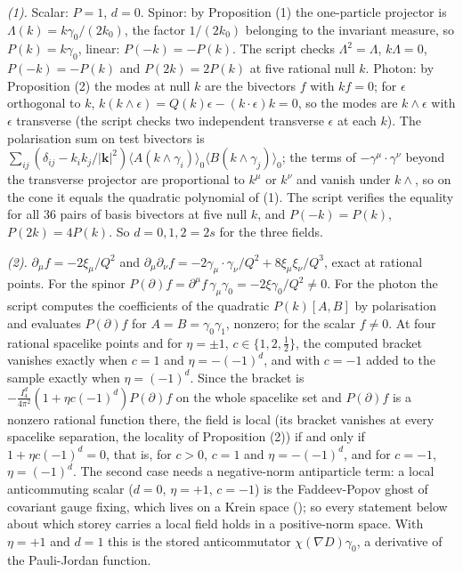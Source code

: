 \emph{(1).} Scalar: $P = 1$, $d = 0$. Spinor: by Proposition (1) the one-particle projector is $\Lambda(k) = k\gamma_{0}/(2k_{0})$, the factor $1/(2k_{0})$ belonging to the invariant measure, so $P(k) = k\gamma_{0}$, linear: $P(-k) = -P(k)$. The script checks $\Lambda^{2} = \Lambda$, $k\Lambda = 0$, $P(-k) = -P(k)$ and $P(2k) = 2P(k)$ at five rational null $k$. Photon: by Proposition (2) the modes at null $k$ are the bivectors $f$ with $kf = 0$; for $\epsilon$ orthogonal to $k$, $k(k \wedge \epsilon) = Q(k)\epsilon - (k\cdot\epsilon)k = 0$, so the modes are $k \wedge \epsilon$ with $\epsilon$ transverse (the script checks two independent transverse $\epsilon$ at each $k$). The polarisation sum on test bivectors is $\sum_{ij}(\delta_{ij} - k_{i}k_{j}/|\mathbf{k}|^{2})\langle A(k \wedge \gamma_{i})\rangle_{0}\langle B(k \wedge \gamma_{j})\rangle_{0}$; the terms of $-\gamma^{\mu}\cdot\gamma^{\nu}$ beyond the transverse projector are proportional to $k^{\mu}$ or $k^{\nu}$ and vanish under $k \wedge$, so on the cone it equals the quadratic polynomial of (1). The script verifies the equality for all $36$ pairs of basis bivectors at five null $k$, and $P(-k) = P(k)$, $P(2k) = 4P(k)$. So $d = 0, 1, 2 = 2s$ for the three fields.

\emph{(2).} $\partial_{\mu}f = -2\xi_{\mu}/Q^{2}$ and $\partial_{\mu}\partial_{\nu}f = -2\gamma_{\mu}\cdot\gamma_{\nu}/Q^{2} + 8\xi_{\mu}\xi_{\nu}/Q^{3}$, exact at rational points. For the spinor $P(\partial)f = \partial^{\mu}f\,\gamma_{\mu}\gamma_{0} = -2\xi\gamma_{0}/Q^{2} \neq 0$. For the photon the script computes the coefficients of the quadratic $P(k)[A, B]$ by polarisation and evaluates $P(\partial)f$ for $A = B = \gamma_{0}\gamma_{1}$, nonzero; for the scalar $f \neq 0$. At four rational spacelike points and for $\eta = \pm 1$, $c \in \{1, 2, \tfrac12\}$, the computed bracket vanishes exactly when $c = 1$ and $\eta = -(-1)^{d}$, and with $c = -1$ added to the sample exactly when $\eta = (-1)^{d}$. Since the bracket is $-\tfrac{I_{4}^{d}}{4\pi^{2}}(1 + \eta c(-1)^{d})P(\partial)f$ on the whole spacelike set and $P(\partial)f$ is a nonzero rational function there, the field is local (its bracket vanishes at every spacelike separation, the locality of Proposition (2)) if and only if $1 + \eta c(-1)^{d} = 0$, that is, for $c > 0$, $c = 1$ and $\eta = -(-1)^{d}$, and for $c = -1$, $\eta = (-1)^{d}$. The second case needs a negative-norm antiparticle term: a local anticommuting scalar ($d = 0$, $\eta = +1$, $c = -1$) is the Faddeev-Popov ghost of covariant gauge fixing, which lives on a Krein space (); so every statement below about which storey carries a local field holds in a positive-norm space. With $\eta = +1$ and $d = 1$ this is the stored anticommutator $\chi(\nabla D)\gamma_{0}$, a derivative of the Pauli-Jordan function.

